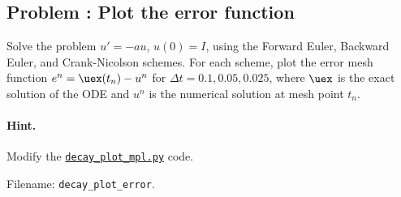 \documentclass[graybox,sectrefs,envcountresetchap,open=right,final]{svmonodo}
\newenvironment{doconceexercise}{}{}
\newcounter{doconceexercisecounter}
\begin{document}
\begin{doconceexercise}

\subsection*{Problem \thedoconceexercisecounter: Plot the error function}

\label{decay:exer:plot:error}

Solve the problem $u'=-au$, $u(0)=I$, using the Forward Euler, Backward
Euler, and Crank-Nicolson schemes. For each scheme, plot the error mesh
function $e^n = \uex(t_n)-u^n$ for $\Delta t=0.1, 0.05, 0.025$,
where $\uex$ is the exact solution of the ODE and
$u^n$ is the numerical solution at mesh point $t_n$.


\paragraph{Hint.}
Modify the \href{{http://tinyurl.com/ofkw6kc/alg/decay_plot_mpl.py}}{\nolinkurl{decay_plot_mpl.py}} code.



\noindent Filename: \Verb!decay_plot_error!.

\end{doconceexercise}
\end{document}

